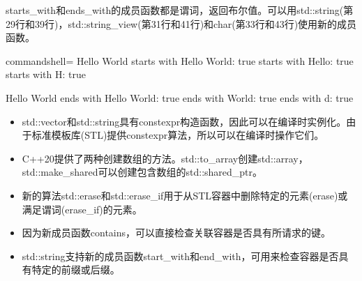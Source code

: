 starts\_with和ends\_with的成员函数都是谓词，返回布尔值。可以用std::string(第29行和39行)，std::string\_view(第31行和41行)和char(第33行和43行)使用新的成员函数。

\begin{tcblisting}{commandshell={}}
Hello World
            starts with Hello World: true
            starts with Hello: true
            starts with H: true
            
Hello World
            ends with Hello World: true
            ends with World: true
            ends with d: true
\end{tcblisting}

\begin{tcolorbox}[breakable,enhanced jigsaw,colback=mygreen!5!white,colframe=mygreen!75!black,title={总结}]
	
\begin{itemize}
\item 
std::vector和std::string具有constexpr构造函数，因此可以在编译时实例化。由于标准模板库(STL)提供constexpr算法，所以可以在编译时操作它们。

\item 
C++20提供了两种创建数组的方法。std::to\_array创建std::array，std::make\_shared可以创建包含数组的std::shared\_ptr。

\item 
新的算法std::erase和std::erase\_if用于从STL容器中删除特定的元素(erase)或满足谓词(erase\_if)的元素。

\item 
因为新成员函数contains，可以直接检查关联容器是否具有所请求的键。

\item 
std::string支持新的成员函数start\_with和end\_with，可用来检查容器是否具有特定的前缀或后缀。
\end{itemize}
	
\end{tcolorbox}


\newpage


















